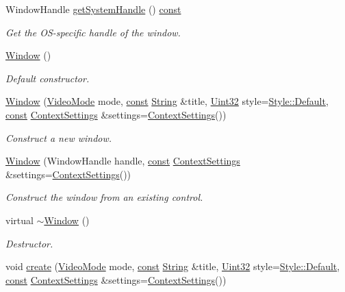 \begin{DoxyCompactItemize}
Window\-Handle \hyperlink{classsf_1_1_window_a26368e7162229f8637c34d80ab0f138e}{get\-System\-Handle} () \hyperlink{term__entry_8h_a57bd63ce7f9a353488880e3de6692d5a}{const} 
\begin{DoxyCompactList}\small\item\em Get the O\-S-\/specific handle of the window. \end{DoxyCompactList}\item 
\hyperlink{classsf_1_1_window_a5359122166b4dc492c3d25caf08ccfc4}{Window} ()
\begin{DoxyCompactList}\small\item\em Default constructor. \end{DoxyCompactList}\item 
\hyperlink{classsf_1_1_window_a1bee771baecbae6d357871929dc042a2}{Window} (\hyperlink{classsf_1_1_video_mode}{Video\-Mode} mode, \hyperlink{term__entry_8h_a57bd63ce7f9a353488880e3de6692d5a}{const} \hyperlink{classsf_1_1_string}{String} \&title, \hyperlink{namespacesf_aa746fb1ddef4410bddf198ebb27e727c}{Uint32} style=\hyperlink{group__window_gga363853f6419f9ca64dcd85eae2e5caa9aaf73ca9c9fa787f9da9c1d7527d42734}{Style\-::\-Default}, \hyperlink{term__entry_8h_a57bd63ce7f9a353488880e3de6692d5a}{const} \hyperlink{structsf_1_1_context_settings}{Context\-Settings} \&settings=\hyperlink{structsf_1_1_context_settings}{Context\-Settings}())
\begin{DoxyCompactList}\small\item\em Construct a new window. \end{DoxyCompactList}\item 
\hyperlink{classsf_1_1_window_a6d60912633bff9d33cf3ade4e0201de4}{Window} (Window\-Handle handle, \hyperlink{term__entry_8h_a57bd63ce7f9a353488880e3de6692d5a}{const} \hyperlink{structsf_1_1_context_settings}{Context\-Settings} \&settings=\hyperlink{structsf_1_1_context_settings}{Context\-Settings}())
\begin{DoxyCompactList}\small\item\em Construct the window from an existing control. \end{DoxyCompactList}\item 
virtual \hyperlink{classsf_1_1_window_ac30eb6ea5f5594204944d09d4bd69a97}{$\sim$\-Window} ()
\begin{DoxyCompactList}\small\item\em Destructor. \end{DoxyCompactList}\item 
void \hyperlink{classsf_1_1_window_a30e6edf2162f8dbff61023b9de5d961d}{create} (\hyperlink{classsf_1_1_video_mode}{Video\-Mode} mode, \hyperlink{term__entry_8h_a57bd63ce7f9a353488880e3de6692d5a}{const} \hyperlink{classsf_1_1_string}{String} \&title, \hyperlink{namespacesf_aa746fb1ddef4410bddf198ebb27e727c}{Uint32} style=\hyperlink{group__window_gga363853f6419f9ca64dcd85eae2e5caa9aaf73ca9c9fa787f9da9c1d7527d42734}{Style\-::\-Default}, \hyperlink{term__entry_8h_a57bd63ce7f9a353488880e3de6692d5a}{const} \hyperlink{structsf_1_1_context_settings}{Context\-Settings} \&settings=\hyperlink{structsf_1_1_context_settings}{Context\-Settings}())

\end{DoxyCompactItemize}
